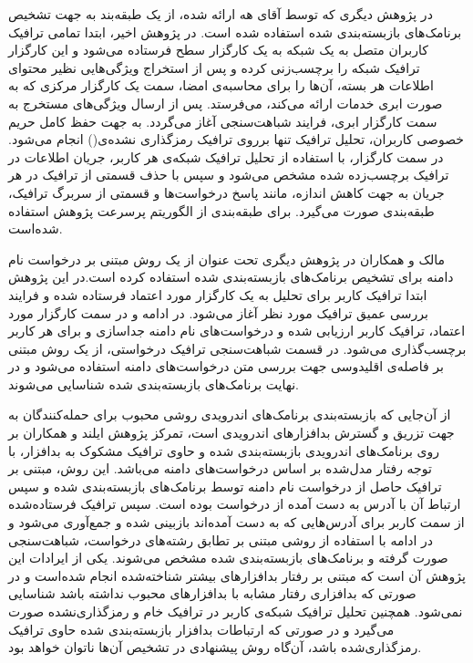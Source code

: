 در پژوهش دیگری که توسط آقای هه ارا‌ئه‌ شده‌، از یک طبقه‌بند به جهت تشخیص برنامک‌های بازبسته‌بندی شده استفاده شده است. در پژوهش اخیر، ابتدا تمامی ترافیک کاربران متصل به یک شبکه به یک کارگزار سطح فرستاده می‌شود و این کارگزار ترافیک شبکه را برچسب‌زنی‌ کرده و پس از استخراج ویژگی‌هایی نظیر محتوای‌ اطلاعات هر بسته، آن‌ها را برای محاسبه‌ی امضا، سمت یک کارگزار مرکزی که به صورت ابری‌ خدمات ارائه می‌کند، می‌فرستد. پس از ارسال ویژگی‌های مستخرج به سمت کارگزار ابری، فرایند شباهت‌سنجی آغاز می‌گردد. به جهت حفظ کامل حریم خصوصی کاربران، تحلیل ترافیک تنها برروی ترافیک رمز‌گذاری نشده‌ی() انجام می‌شود. در سمت کارگزار، با استفاده از تحلیل ترافیک شبکه‌‌ی هر کاربر، جریان اطلاعات در ترافیک برچسب‌زده شده مشخص می‌شود و سپس با حذف قسمتی از ترافیک در هر جریان به جهت کاهش اندازه، مانند پاسخ درخواست‌ها‌ و قسمتی از سربرگ‌ ترافیک، طبقه‌بندی صورت می‌گیرد. برای طبقه‌بندی از الگوریتم پرسرعت پژوهش  استفاده شده‌است.

مالک و همکاران در پژوهش دیگری تحت عنوان  از یک روش مبتنی بر درخواست نام دامنه‌ برای تشخیص برنامک‌‌های بازبسته‌بندی شده استفاده کرده است.در این پژوهش ابتدا ترافیک کاربر برای تحلیل به یک کارگزار مورد اعتماد فرستاده شده و فرایند بررسی عمیق ترافیک مورد نظر آغاز می‌شود. در ادامه و در سمت کارگزار مورد اعتماد، ترافیک کاربر ارزیابی شده و درخواست‌های نام دامنه جداسازی و برای هر کاربر برچسب‌گذاری می‌شود. در قسمت شباهت‌سنجی ترافیک درخواستی، از یک روش مبتنی بر فاصله‌ی اقلیدوسی جهت بررسی متن درخواست‌های دامنه استفاده می‌شود و در نهایت برنامک‌‌های بازبسته‌بندی شده شناسایی می‌شوند.

از آن‌جایی که بازبسته‌بندی برنامک‌های اندرویدی روشی محبوب برای حمله‌کنندگان به جهت تزریق و گسترش بدافزار‌های اندرویدی است، تمرکز          پژوهش ایلند و همکاران  بر روی برنامک‌های اندرویدی بازبسته‌بندی شده و حاوی ترافیک مشکوک به بدافزار، با توجه رفتار مدل‌شده بر اساس درخواست‌های دامنه می‌باشد. این روش، مبتنی بر ترافیک حاصل از درخواست نام دامنه توسط برنامک‌های بازبسته‌بندی شده و سپس ارتباط آن با آدرس به دست آمده از درخواست بوده‌ است. سپس ترافیک فرستاده‌شده از سمت کاربر برای آدرس‌هایی که به دست آمده‌اند بازبینی شده و جمع‌آوری می‌شود و در ادامه با استفاده از روشی مبتنی بر تطابق رشته‌های‌ درخواست، شباهت‌سنجی صورت گرفته و برنامک‌های بازبسته‌بندی شده مشخص می‌شوند. یکی از ایرادات این پژوهش آن است که مبتنی بر رفتار بدافزار‌های بیشتر شناخته‌شده انجام شده‌است و در صورتی که بدافزاری رفتار مشابه با بدافزار‌های محبوب نداشته باشد شناسایی نمی‌شود. همچنین تحلیل ترافیک شبکه‌ی کاربر در ترافیک خام و رمزگذاری‌نشده صورت می‌گیرد و در صورتی که ارتباطات بدافزار بازبسته‌بندی شده حاوی ترافیک رمز‌گذاری‌شده باشد، آن‌گاه روش پیشنهادی در تشخیص آن‌ها ناتوان خواهد بود.

